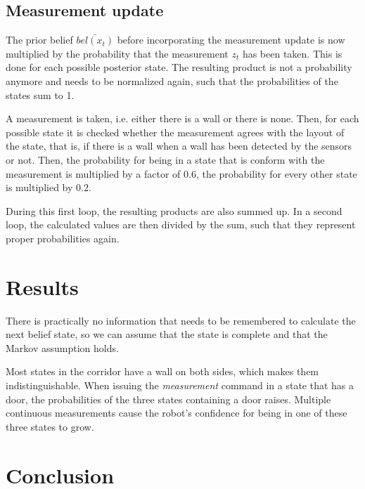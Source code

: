 \documentclass[10pt,a4paper]{article}
\begin{document}
		\subsection{Measurement update}		
		The prior belief $\bar{bel(x_t)}$ before incorporating the measurement update is now multiplied by the probability that the measurement $z_t$ has been taken. This is done for each possible posterior state. The resulting product is not a probability anymore and needs to be normalized again, such that the probabilities of the states sum to 1.
		
		A measurement is taken, i.e. either there is a wall or there is none. Then, for each possible state it is checked whether the measurement agrees with the layout of the state, that is, if there is a wall when a wall has been detected by the sensors or not. Then, the probability for being in a state that is conform with the measurement is multiplied by a factor of $0.6$, the probability for every other state is multiplied by $0.2$. 
		
		During this first loop, the resulting products are also summed up. In a second loop, the calculated values are then divided by the sum, such that they represent proper probabilities again.
	
	\section{Results}
	There is practically no information that needs to be remembered to calculate the next belief state, so we can assume that the state is complete and that the Markov assumption holds.
	
	Most states in the corridor have a wall on both sides, which makes them indistinguishable.
	When issuing the \textit{measurement} command in a state that has a door, the probabilities of the three states containing a door raises. Multiple continuous measurements cause the robot's confidence for being in one of these three states to grow.
	
	\section{Conclusion}
	
\end{document}
